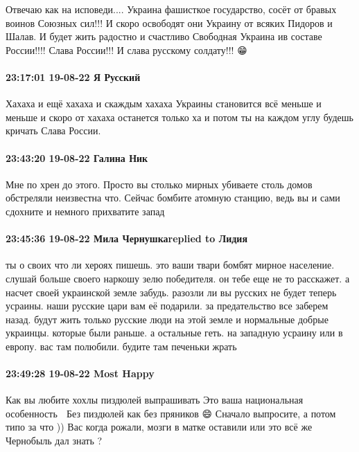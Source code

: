 Отвечаю как на исповеди.... Украина фашисткое государство, сосёт от бравых
воинов Союзных сил!!! И скоро освободят они Украину от всяких Пидоров и Шалав.
И будет жить радостно и счастливо Свободная Украина ив составе России!!!! Слава
России!!! И слава русскому солдату!!! 😁

\paragraph{23:17:01 19-08-22 Я Русский}

Хахаха и ещё хахаха и скаждым хахаха Украины становится всё меньше и меньше и
скоро от хахаха останется только ха и потом ты на каждом углу будешь кричать
Слава России.

\paragraph{23:43:20 19-08-22 Галина Ник}

Мне по хрен до этого. Просто вы столько мирных убиваете столь домов обстреляли
неизвестна что. Сейчас бомбите атомную станцию, ведь вы и сами сдохните и
немного прихватите запад

\paragraph{23:45:36 19-08-22 Мила Чернушкаreplied to Лидия}

ты о своих что ли хероях пишешь. это ваши твари бомбят мирное население. слушай
больше своего наркошу зелю победителя. он тебе еще не то расскажет. а насчет
своей украинской земле забудь. разозли ли вы русских не будет теперь усраины.
наши русские цари вам её подарили. за предательство все заберем назад. будут
жить только русские люди на этой земле и нормальные добрые украинцы. которые
были раньше. а остальные геть. на западную усраину или в европу. вас там
полюбили. будите там печеньки жрать

\paragraph{23:49:28 19-08-22 Most Happy}

Как вы любите хохлы пиздюлей выпрашивать 
Это ваша национальная особенность 🤧
Без пиздюлей как без пряников 😄
Сначало выпросите,  а потом типо за что )) 
Вас когда рожали,  мозги в матке оставили или это всё же Чернобыль дал знать ? 🤔
